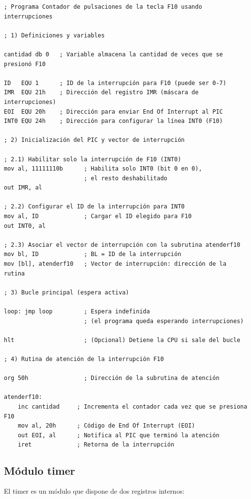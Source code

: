 \documentclass[12pt,oneside]{templates/unerthesis}
\begin{document}
\begin{lstlisting}
; Programa Contador de pulsaciones de la tecla F10 usando interrupciones

; 1) Definiciones y variables

cantidad db 0   ; Variable almacena la cantidad de veces que se presionó F10

ID   EQU 1      ; ID de la interrupción para F10 (puede ser 0-7)
IMR  EQU 21h    ; Dirección del registro IMR (máscara de interrupciones)
EOI  EQU 20h    ; Dirección para enviar End Of Interrupt al PIC
INT0 EQU 24h    ; Dirección para configurar la línea INT0 (F10)

; 2) Inicialización del PIC y vector de interrupción

; 2.1) Habilitar solo la interrupción de F10 (INT0)
mov al, 11111110b      ; Habilita solo INT0 (bit 0 en 0),
                       ; el resto deshabilitado
out IMR, al

; 2.2) Configurar el ID de la interrupción para INT0
mov al, ID             ; Cargar el ID elegido para F10
out INT0, al

; 2.3) Asociar el vector de interrupción con la subrutina atenderf10
mov bl, ID             ; BL = ID de la interrupción
mov [bl], atenderf10   ; Vector de interrupción: dirección de la rutina

; 3) Bucle principal (espera activa)

loop: jmp loop         ; Espera indefinida 
                       ; (el programa queda esperando interrupciones)

hlt                    ; (Opcional) Detiene la CPU si sale del bucle

; 4) Rutina de atención de la interrupción F10

org 50h                ; Dirección de la subrutina de atención

atenderf10:
    inc cantidad     ; Incrementa el contador cada vez que se presiona F10
    mov al, 20h      ; Código de End Of Interrupt (EOI)
    out EOI, al      ; Notifica al PIC que terminó la atención
    iret             ; Retorna de la interrupción\end{lstlisting}

\hypertarget{muxf3dulo-timer}{%
\subsection{Módulo timer}\label{muxf3dulo-timer}}

El timer es un módulo que dispone de dos registros internos:
\end{document}
